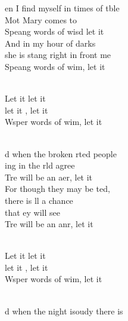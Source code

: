 \documentclass[12pt]{article}
\begin{document}
\begin{multicols*}{2}
\begin{cancion}%
	en I find myself in times of tble\\
	Mot Mary comes to \\
	Speang words of wisd let it  \\
	And in my hour of darks\\
	she is stang right in front  me\\
	Speang words of wim, let it  \\\jump\\
	\begin{chorus}%
	Let it  let it \\
	let it , let it \\
	Wsper words of wim, let it \\
	\end{chorus}%
	\jump\\
	d when the broken rted people\\
	ing in the rld agree\\
	Tre will be an aer, let it  \\
	For though they may be ted, \\
	there is ll a chance \\
	that ey will see\\
	Tre will be an anr, let it  \\\jump\\
	\begin{chorus}%
	Let it  let it \\
	let it , let it \\
	Wsper words of wim, let it \\
	\end{chorus}%
	\jump\\
	d when the night isoudy there is\\

\end{cancion}
\end{multicols*}
\end{document}
